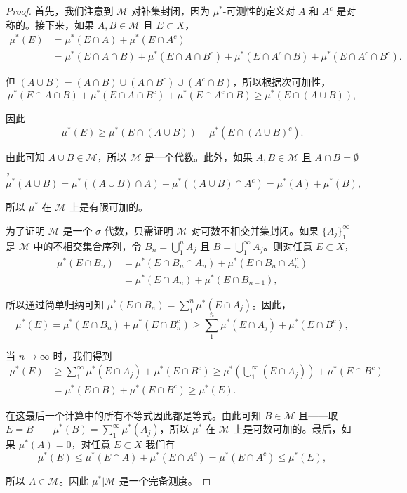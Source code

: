 \documentclass[lang=cn,10pt,thmcnt=section]{elegantbook}
\begin{document}
\begin{proof}
首先，我们注意到 $\mathcal{M}$ 对补集封闭，因为 $\mu^*$-可测性的定义对 $A$ 和 $A^c$ 是对称的。接下来，如果 $A, B \in \mathcal{M}$ 且 $E \subset X$，
\begin{align}
\mu^*(E) &= \mu^*(E \cap A) + \mu^*(E \cap A^c)\\
&= \mu^*(E \cap A \cap B) + \mu^*(E \cap A \cap B^c) + \mu^*(E \cap A^c \cap B) + \mu^*(E \cap A^c \cap B^c).
\end{align}

但 $(A \cup B) = (A \cap B) \cup (A \cap B^c) \cup (A^c \cap B)$，所以根据次可加性，
\[\mu^*(E \cap A \cap B) + \mu^*(E \cap A \cap B^c) + \mu^*(E \cap A^c \cap B) \geq \mu^*(E \cap (A \cup B)),\]

因此
\[\mu^*(E) \geq \mu^*(E \cap (A \cup B)) + \mu^*(E \cap (A \cup B)^c).\]

由此可知 $A \cup B \in \mathcal{M}$，所以 $\mathcal{M}$ 是一个代数。此外，如果 $A, B \in \mathcal{M}$ 且 $A \cap B = \emptyset$，
\[\mu^*(A \cup B) = \mu^*((A \cup B) \cap A) + \mu^*((A \cup B) \cap A^c) = \mu^*(A) + \mu^*(B),\]

所以 $\mu^*$ 在 $\mathcal{M}$ 上是有限可加的。

为了证明 $\mathcal{M}$ 是一个 $\sigma$-代数，只需证明 $\mathcal{M}$ 对可数不相交并集封闭。如果 $\{A_j\}_1^\infty$ 是 $\mathcal{M}$ 中的不相交集合序列，令 $B_n = \bigcup_1^n A_j$ 且 $B = \bigcup_1^\infty A_j$。则对任意 $E \subset X$，
\begin{align}
\mu^*(E \cap B_n) &= \mu^*(E \cap B_n \cap A_n) + \mu^*(E \cap B_n \cap A_n^c)\\
&= \mu^*(E \cap A_n) + \mu^*(E \cap B_{n-1}),
\end{align}

所以通过简单归纳可知 $\mu^*(E \cap B_n) = \sum_1^n \mu^*(E \cap A_j)$。因此，
\[\mu^*(E) = \mu^*(E \cap B_n) + \mu^*(E \cap B_n^c) \geq \sum_1^n \mu^*(E \cap A_j) + \mu^*(E \cap B^c),\]

当 $n \to \infty$ 时，我们得到
\begin{align}
\mu^*(E) &\geq \sum_1^\infty \mu^*(E \cap A_j) + \mu^*(E \cap B^c) \geq \mu^*\left(\bigcup_1^\infty (E \cap A_j)\right) + \mu^*(E \cap B^c)\\
&= \mu^*(E \cap B) + \mu^*(E \cap B^c) \geq \mu^*(E).
\end{align}

在这最后一个计算中的所有不等式因此都是等式。由此可知 $B \in \mathcal{M}$ 且——取 $E = B$——$\mu^*(B) = \sum_1^\infty \mu^*(A_j)$，所以 $\mu^*$ 在 $\mathcal{M}$ 上是可数可加的。最后，如果 $\mu^*(A) = 0$，对任意 $E \subset X$ 我们有
\[\mu^*(E) \leq \mu^*(E \cap A) + \mu^*(E \cap A^c) = \mu^*(E \cap A^c) \leq \mu^*(E),\]

所以 $A \in \mathcal{M}$。因此 $\mu^*|\mathcal{M}$ 是一个完备测度。
\end{proof}
\end{document}
